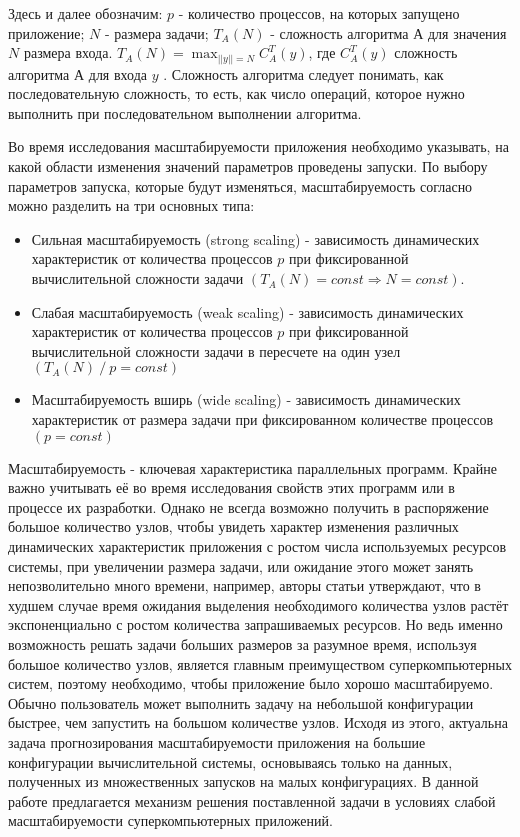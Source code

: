 	Здесь и далее обозначим: \(p\) - количество процессов, на которых запущено приложение; \(N\) - размера задачи; \(T_A(N)\) - сложность алгоритма \(А\) для значения \(N\) размера входа. \(T_A(N) = \max_{||y|| = N} C^T_A(y)\), где \(C^T_A(y)\) сложность алгоритма \(А\) для входа \(y\) \cite{COMPLEXITY}. Сложность алгоритма следует понимать, как последовательную сложность, то есть, как число операций, которое нужно выполнить при последовательном выполнении алгоритма.

	Во время исследования масштабируемости приложения необходимо указывать, на какой области изменения значений параметров проведены запуски. По выбору параметров запуска, которые будут изменяться, масштабируемость согласно \cite{scaling_types} можно разделить на три основных типа:
	\begin{itemize}
		\item Сильная масштабируемость (strong scaling) - зависимость динамических характеристик от количества процессов \(p\) при фиксированной вычислительной сложности задачи \((T_A(N) = const \Rightarrow N = const)\).
		\item Слабая масштабируемость (weak scaling) - зависимость динамических характеристик от количества процессов \(p\) при фиксированной вычислительной сложности задачи в пересчете на один узел \((T_A(N)\:/\:p = const)\)
		\item Масштабируемость вширь (wide scaling) - зависимость динамических характеристик от размера задачи при фиксированном количестве процессов \((p = const)\)
	\end{itemize}

	Масштабируемость - ключевая характеристика параллельных программ. Крайне важно учитывать её во время исследования свойств этих программ или в процессе их разработки.
	Однако не всегда возможно получить в распоряжение большое количество узлов, чтобы увидеть характер изменения различных динамических характеристик приложения с ростом числа используемых ресурсов системы, при увеличении размера задачи, или ожидание этого может занять непозволительно много времени, например, авторы статьи \cite{log_main} утверждают, что в худшем случае время ожидания выделения необходимого количества узлов растёт экспоненциально с ростом количества запрашиваемых ресурсов. Но ведь именно возможность решать задачи больших размеров за разумное время, используя большое количество узлов, является главным преимуществом суперкомпьютерных систем, поэтому необходимо, чтобы приложение было хорошо масштабируемо. Обычно пользователь может выполнить задачу на небольшой конфигурации быстрее, чем запустить на большом количестве узлов. Исходя из этого, актуальна задача прогнозирования масштабируемости приложения на большие конфигурации вычислительной системы, основываясь только на данных, полученных из множественных запусков на малых конфигурациях. В данной работе предлагается механизм решения поставленной задачи в условиях слабой масштабируемости суперкомпьютерных приложений.
\clearpage

